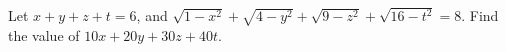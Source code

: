 Let $x+y+z+t=6$, and $\sqrt{1-x^{2}}+\sqrt{4-y^{2}}+\sqrt{9-z^{2}}+\sqrt{16-t^{2}}=8$. Find the value of $10x+20y+30z+40t$.
